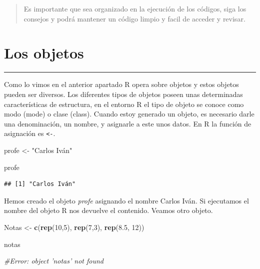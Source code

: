 \documentclass[]{article}
\newenvironment{Shaded}{\begin{snugshade}}{\end{snugshade}}
\newcommand{\KeywordTok}[1]{\textcolor[rgb]{0.13,0.29,0.53}{\textbf{{#1}}}}
\newcommand{\DecValTok}[1]{\textcolor[rgb]{0.00,0.00,0.81}{{#1}}}
\newcommand{\FloatTok}[1]{\textcolor[rgb]{0.00,0.00,0.81}{{#1}}}
\newcommand{\StringTok}[1]{\textcolor[rgb]{0.31,0.60,0.02}{{#1}}}
\newcommand{\CommentTok}[1]{\textcolor[rgb]{0.56,0.35,0.01}{\textit{{#1}}}}
\newcommand{\NormalTok}[1]{{#1}}
\begin{document}
\begin{quote}
Es importante que sea organizado en la ejecución de los códigos, siga
los consejos y podrá mantener un código limpio y facil de acceder y
revisar.
\end{quote}

\section{Los objetos}\label{los-objetos}

\begin{center}\rule{0.5\linewidth}{\linethickness}\end{center}

Como lo vimos en el anterior apartado R opera sobre objetos y estos
objetos pueden ser diversos. Los diferentes tipos de objetos poseen unas
determinadas características de estructura, en el entorno R el tipo de
objeto se conoce como modo (mode) o clase (class). Cuando estoy generado
un objeto, es necesario darle una denominación, un nombre, y asignarle a
este unos datos. En R la función de asignación es \texttt{\textless{}-}.

\begin{Shaded}
\begin{Highlighting}[]
\NormalTok{profe <-}\StringTok{ "Carlos Iván"}

\NormalTok{profe}
\end{Highlighting}
\end{Shaded}

\begin{verbatim}
## [1] "Carlos Iván"
\end{verbatim}

Hemos creado el objeto \emph{profe} asignando el nombre Carlos Iván. Si
ejecutamos el nombre del objeto R nos devuelve el contenido. Veamos otro
objeto.

\begin{Shaded}
\begin{Highlighting}[]
\NormalTok{Notas <-}\StringTok{ }\KeywordTok{c}\NormalTok{(}\KeywordTok{rep}\NormalTok{(}\DecValTok{10}\NormalTok{,}\DecValTok{5}\NormalTok{), }\KeywordTok{rep}\NormalTok{(}\DecValTok{7}\NormalTok{,}\DecValTok{3}\NormalTok{), }\KeywordTok{rep}\NormalTok{(}\FloatTok{8.5}\NormalTok{, }\DecValTok{12}\NormalTok{))}

\NormalTok{notas}

\CommentTok{#Error: object 'notas' not found}
\end{Highlighting}
\end{Shaded}
\end{document}
